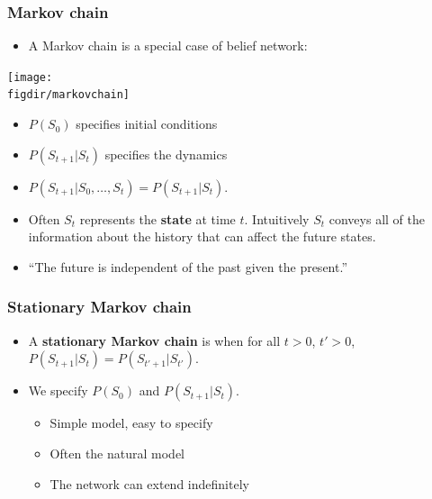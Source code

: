 \documentclass[12pt]{beamer} %
\newcommand{\figdir}{../../figures/ch06}
\begin{document}
\begin{frame}
\frametitle{Markov chain}
\begin{itemize}
\item
A Markov chain is a special case of belief network:
\end{itemize}
\begin{center}
\texttt{[image: \\figdir/markovchain]}
\end{center}
\pause
\begin{itemize}
\item $P(S_0)$ specifies initial conditions
\item $P(S_{t+1}|S_t)$ specifies the dynamics
\item $P(S_{t+1}|S_0,\dots ,S_t)=P(S_{t+1}|S_t)$. 
\item Often $S_t$ represents the \textbf{state} at time $t$. Intuitively $S_t$
conveys all of the information about the history that can affect the
future states.

\item ``The future is independent of the past given the present.''
\end{itemize}

\end{frame}
\begin{frame}
\frametitle{Stationary Markov chain}
\begin{itemize}
\item
A \textbf{stationary Markov
chain} is when
for all $t>0$, $t'>0$,
$P(S_{t+1}|S_t)=P(S_{t'+1}|S_{t'})$.
\item
We specify $P(S_0)$ and $P(S_{t+1}|S_t)$.
\begin{itemize}
\item Simple model, easy to specify
\item Often the natural model
\item The network can extend indefinitely
\end{itemize}

\end{itemize}

\end{frame}
\end{document}
